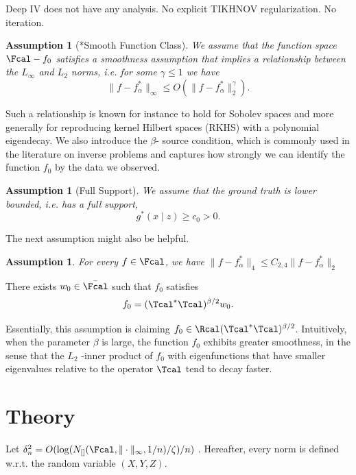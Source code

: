 \documentclass[12pt]{extarticle} %
\newtheorem{assumption}[theorem]{Assumption}
\begin{document}
\begin{remark}
    Deep IV \citep{hartford2017deep} does not have any analysis. No explicit TIKHNOV regularization.  No iteration. 
\end{remark}
\begin{assumption}[*Smooth Function Class]\label{ass:smooth-func}
    We assume that the function space $\Fcal -f_0 $ satisfies
a smoothness assumption that implies a relationship between the $L_\infty$ and $L_2$ norms, i.e. for some $\gamma \leq 1$ we have $$
\|f - f_\alpha^*\|_\infty \leq O(\|f - f_\alpha^*\|_2^\gamma).
$$
\end{assumption}
Such a relationship is known for instance to hold for Sobolev spaces and more generally
for reproducing kernel Hilbert spaces (RKHS) with a polynomial eigendecay.
We also introduce the $\beta$- source condition, which is commonly used in the literature on inverse problems and captures how strongly we can identify the function $f_0$ by the data we observed. 
\begin{assumption}[Full Support]\label{ass:full-supp}
    We assume that the ground truth is lower bounded, i.e. has a full support, $$
    g^*(x\mid z) \geq c_0 >0.
    $$
\end{assumption}
The next assumption might also be helpful. \begin{assumption}\label{ass:bound-2-4}
    For every $f \in \Fcal$, we have $\|f-f_\alpha^*\|_4 \leq C_{2,4}\|f-f_\alpha^*\|_2$
\end{assumption}
\begin{definition}\label{def:source-cond}
    There exists $w_0\in\bar{\Fcal}$ such that $f_0$ satisfies $$
    f_0 = (\Tcal^*\Tcal)^{\beta/2} w_0.
    $$
\end{definition}
Essentially, this assumption is claiming $
f_0 \in \Rcal(\Tcal^*\Tcal)^{\beta/2}$. Intuitively, when the parameter $\beta$ is large, the function $ f_0$ exhibits greater smoothness, in the sense that the $L_2$ -inner product of $f_0$ with eigenfunctions that have smaller eigenvalues relative to the operator $\Tcal$ tend to decay faster.

\section{Theory}

Let $\delta^2_n = O(\log(N_{[]}(\Fcal, \|\cdot\|_\infty, 1/n)/\zeta)/n)$ . Hereafter, every norm is defined w.r.t. the random variable $(X,Y,Z)$. 
\end{document}
